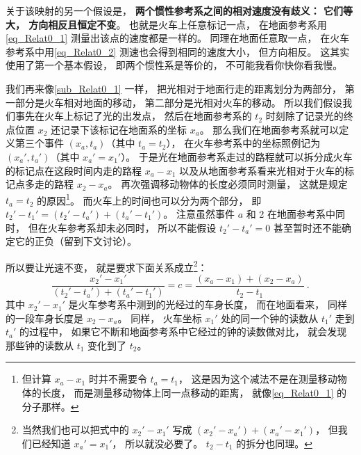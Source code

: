关于该映射的另一个假设是， \textbf{两个惯性参考系之间的相对速度没有歧义： 它们等大， 方向相反且恒定不变}。 也就是火车上任意标记一点， 在地面参考系用\autoref{eq_Relat0_1} 测量出该点的速度都是一样的。 同理在地面任意取一点， 在火车参考系中用\autoref{eq_Relat0_2} 测速也会得到相同的速度大小， 但方向相反。 这其实使用了第一个基本假设， 即两个惯性系是等价的， 不可能我看你快你看我慢。

我们再来像\autoref{sub_Relat0_1} 一样， 把光相对于地面行走的距离划分为两部分， 第一部分是火车相对地面的移动， 第二部分是光相对火车的移动。 所以我们假设我们事先在火车上标记了光的出发点， 然后在地面参考系的 $t_2$ 时刻除了记录光的终点位置 $x_2$ 还记录下该标记在地面系的坐标 $x_a$。 那么我们在地面参考系就可以定义第三个事件 $(x_a, t_a)$（其中 $t_a = t_2$）， 在火车参考系中的坐标照例记为 $(x_a', t_a')$（其中 $x_a' = x_1'$）。 于是光在地面参考系走过的路程就可以拆分成火车的标记点在这段时间内走的路程 $x_a - x_1$ 以及从地面参考系看来光相对于火车的标记点多走的路程 $x_2 - x_a$。 再次强调移动物体的长度必须同时测量， 这就是规定 $t_a = t_2$ 的原因\footnote{但计算 $x_a-x_1$ 时并不需要令 $t_a = t_1$， 这是因为这个减法不是在测量移动物体的长度， 而是测量移动物体上同一点移动的距离， 就像\autoref{eq_Relat0_1} 的分子那样。}。 而火车上的时间也可以分为两个部分， 即 $t_2' - t_1' = (t_2' - t_a') + (t_a' - t_1')$。 注意虽然事件 $a$ 和 2 在地面参考系中同时， 但在火车参考系却未必同时， 所以不能假设 $t_2' - t_a' = 0$ 甚至暂时还不能确定它的正负（留到下文讨论）。

所以要让光速不变， 就是要求下面关系成立\footnote{当然我们也可以把式中的 $x_2' - x_1'$ 写成 $(x_2'-x_a') + (x_a'-x_1')$， 但我们已经知道 $x_a'=x_1'$， 所以就没必要了。 $t_2-t_1$ 的拆分也同理。}：
\begin{equation} \label{eq_Relat0_3}
\frac{x_2' - x_1'}{(t_2' - t_a') + (t_a' - t_1')} = c = \frac{(x_a - x_1) + (x_2 - x_a)}{t_2 - t_1}~.
\end{equation}
其中 $x_2' - x_1'$ 是火车参考系中测到的光经过的车身长度， 而在地面看来， 同样的一段车身长度是 $x_2 - x_a$。 同样， 火车坐标 $x_1'$ 处的同一个钟的读数从 $t_1'$ 走到 $t_a'$ 的过程中， 如果它不断和地面参考系中它经过的钟的读数做对比， 就会发现那些钟的读数从 $t_1$ 变化到了 $t_2$。

